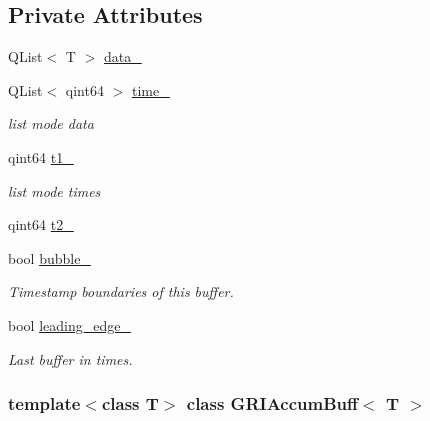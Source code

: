 \subsection*{\-Private \-Attributes}
\begin{DoxyCompactItemize}
\item 
\-Q\-List$<$ \-T $>$ \hyperlink{classGRIAccumBuff_a62ce6b1368c96c9bbb8db231415dfa17}{data\-\_\-}
\item 
\-Q\-List$<$ qint64 $>$ \hyperlink{classGRIAccumBuff_a9e86e603efd9fd1fc2b81e150886a110}{time\-\_\-}
\begin{DoxyCompactList}\small\item\em list mode data \end{DoxyCompactList}\item 
qint64 \hyperlink{classGRIAccumBuff_a178faa42c9310620855e01ded9346071}{t1\-\_\-}
\begin{DoxyCompactList}\small\item\em list mode times \end{DoxyCompactList}\item 
qint64 \hyperlink{classGRIAccumBuff_ad0a83f96ba721ae8206fe6f0d9d80149}{t2\-\_\-}
\item 
bool \hyperlink{classGRIAccumBuff_ade93076f7d91b95de01501143cf85b25}{bubble\-\_\-}
\begin{DoxyCompactList}\small\item\em \-Timestamp boundaries of this buffer. \end{DoxyCompactList}\item 
bool \hyperlink{classGRIAccumBuff_af912c9fd29f623504187448efab863a4}{leading\-\_\-edge\-\_\-}
\begin{DoxyCompactList}\small\item\em \-Last buffer in times. \end{DoxyCompactList}\end{DoxyCompactItemize}
\subsubsection*{template$<$class \-T$>$ class G\-R\-I\-Accum\-Buff$<$ T $>$}




